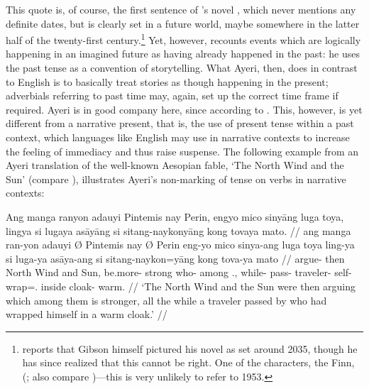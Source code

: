 This quote is, of course, the first sentence of 
\citet{gibson:neuromancer}'s novel , which 
never mentions any definite dates, but is clearly set in a future world, maybe 
somewhere in the latter half of the twenty-first century.\footnote{%
\citet{christian2017} reports that Gibson himself pictured his novel as set 
around 2035, though he has since realized that this cannot be right. One of 
the characters, the Finn,  (\cite{christian2017}; also compare 
\cite[92]{gibson:neuromancer})---this is very unlikely to refer to 1953.} Yet, 
however, \citet{gibson:neuromancer} recounts events which are logically 
happening in an imagined future as having already happened in the past: he 
uses the past tense as a convention of storytelling. What Ayeri, then, does in 
contrast to English is to basically treat stories as though happening in the 
present; adverbials referring to past time may, again, set up the correct time 
frame if required. Ayeri is in good company here, since according to 
\citet{dahl1985} . This, however, is 
yet different from a narrative present, that is, the use of present tense 
within a past context, which languages like English may use in narrative 
contexts to increase the feeling of immediacy and thus raise suspense. The 
following example from an Ayeri translation of the well-known Aesopian fable, 
`The North Wind and the Sun' (compare \cite[39]{ipa2007}), illustrates 
Ayeri's non-marking of tense on verbs in narrative contexts:

\ex
\begingl
	\gla Ang manga ranyon adauyi {} Pintemis nay {} Perin, engyo mico 
		sinyāng luga toya, lingya si lugaya asāyāng si sitang-naykonyāng 
		kong tovaya mato. //
	\glb ang manga ran-yon adauyi Ø Pintemis nay Ø Perin eng-yo mico 
		sinya-ang luga toya ling-ya si luga-ya asāya-ang si 
		sitang-naykon=yāng kong tova-ya mato //
	\glc \AgtT{} \Prog{} argue-\TplN{} then \Top{} {North Wind} and 
		\Top{} Sun, be.more-\TsgN{} strong who-\Aarg{} among 
		\TplN{}.\Loc{}, while-\Loc{} \Rel{} pass-\TsgM{} 
		traveler-\Aarg{} \Rel{} self-wrap=\TsgM{}.\Aarg{} inside 
		cloak-\Loc{} warm. //
	\glft `The North Wind and the Sun were then arguing which among them is 
		stronger, all the while a traveler passed by who had wrapped 
		himself in a warm cloak.' //
\endgl
\xe

